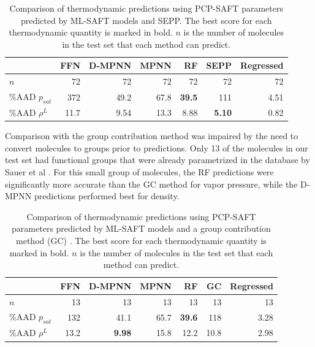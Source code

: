 \begin{table}
	\caption{Comparison of thermodynamic predictions using PCP-SAFT parameters predicted by ML-SAFT models and SEPP.\cite{Kaminski2020} The best score for each thermodynamic quantity is marked in bold. $n$ is the number of molecules in the test set that each method can predict.}
        \label{tab:sepp}
	\begin{center}
        \begin{tabular}{lrrrrr|r}
            & FFN & D-MPNN & MPNN & RF & SEPP & Regressed \\
            \hline
            $n$ & 72 & 72 & 72 & 72 & 72 & 72 \\
            \%AAD $p_{sat}$ & 372 & 49.2 & 67.8 & \textbf{39.5} & 111 & 4.51 \\
            \%AAD $\rho^{L}$ & 11.7 & 9.54 & 13.3 & 8.88 &\textbf{5.10} & 0.82 \\
        \end{tabular}
	\end{center}
\end{table}

Comparison with the group contribution method was impaired by the need to convert molecules to groups prior to predictions. Only 13 of the molecules in our test set had functional groups that were already parametrized in the database by Sauer et al \cite{Sauer2014}. For this small group of molecules, the RF predictions were significantly more accurate than the GC method for vapor pressure, while the D-MPNN predictions performed best for density. 


\begin{table}
	\caption{Comparison of thermodynamic predictions using PCP-SAFT parameters predicted by ML-SAFT models and a group contribution method (GC) \cite{Sauer2014}. The best score for each thermodynamic quantity  is marked in bold. $n$ is the number of molecules in the test set that each method can predict.}
    \label{tab:gc}
	\begin{center}
		\begin{tabular}{lrrrrr|r}
			 & FFN & D-MPNN & MPNN & RF & GC & Regressed \\
			\hline
			$n$ & 13 & 13 & 13 & 13 & 13 & 13 \\
			\%AAD $p_{sat}$ & 132 & 41.1 & 65.7 & \textbf{39.6} & 118 & 3.28 \\
			\%AAD $\rho^{L}$ & 13.2 & \textbf{9.98} & 15.8 & 12.2 & 10.8 & 2.98 \\
		\end{tabular}
	\end{center}
\end{table}

